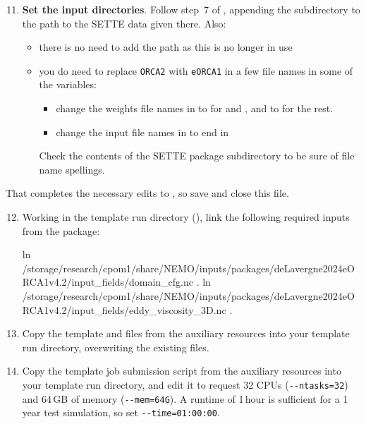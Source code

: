 \begin{enumerate}\setcounter{enumi}{10}
    \item \textbf{Set the input directories}.
        Follow step~7 of , appending the subdirectory  to the path to the SETTE data given there.
        Also:
        \begin{itemize}
            \item there is no need to add the  path as this is no longer in use
            \item you do need to replace \texttt{ORCA2} with \texttt{eORCA1} in a few file names in some of the  variables:
            \begin{itemize}
                \item change the weights file names in  to\linebreak{} for  and , and to  for the rest.
                \item change the input file names in  to end in  
            \end{itemize}
            Check the contents of the  SETTE package subdirectory to be sure of file name spellings. 
        \end{itemize}
\end{enumerate}

That completes the necessary edits to , so save and close this file.

\begin{enumerate}\setcounter{enumi}{11}
    \item Working in the template run directory (), link the following required inputs from the \citet{delavergne2024eorca1} package:

\begingroup\tiny
\begin{VerbatimCMD}
ln  /storage/research/cpom1/share/NEMO/inputs/packages/deLavergne2024eORCA1v4.2/input_fields/domain_cfg.nc .
ln  /storage/research/cpom1/share/NEMO/inputs/packages/deLavergne2024eORCA1v4.2/input_fields/eddy_viscosity_3D.nc .
\end{VerbatimCMD}
\endgroup

    \item Copy the template  and  files from the auxiliary resources into your template run directory, overwriting the existing files.

    \item Copy the template job submission script  from the auxiliary resources into your template run directory, and edit it to request 32 CPUs (\texttt{-{}-ntasks=32}) and 64\,GB of memory (\texttt{-{}-mem=64G}).
        A runtime of 1\,hour is sufficient for a 1\,year test simulation, so set \texttt{-{}-time=01:00:00}.
\end{enumerate}

